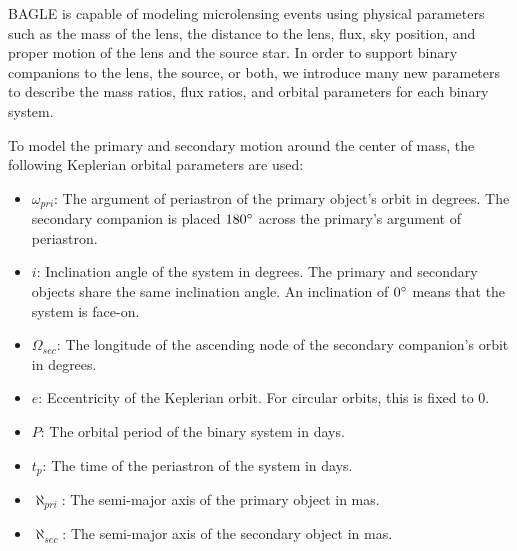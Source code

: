 \documentclass[twocolumn]{aastex701}
\newcommand{\tnot}{t_{0,\sun}}
\newcommand{\w}{\omega_{pri}}
\newcommand{\bigomega}{\Omega_{sec}}
\newcommand{\inclination}{\textit{i}}
\newcommand{\eccentricity}{\textit{e}}
\newcommand{\period}{\textit{P}}
\newcommand{\al}{\aleph_{pri}}
\newcommand{\ala}{\aleph_{sec}}
\begin{document}
BAGLE is capable of modeling microlensing events using physical parameters such as the mass of the lens, the distance to the lens, flux, sky position, and proper motion of the lens and the source star. In order to support binary companions to the lens, the source, or both, we introduce many new parameters to describe the mass ratios, flux ratios, and orbital parameters for each binary system. 

To model the primary and secondary motion around the center of mass, the following Keplerian orbital parameters are used: 



\begin{itemize}
\label{keplerian_elems}
    \item $\w$: The argument of periastron of the primary object's orbit in degrees. The secondary companion is placed $180 \degree$ across the primary's argument of periastron. 
    \item $\inclination$: Inclination angle of the system in degrees. The primary and secondary objects share the same inclination angle.  An inclination of $0\degree$ means that the system is face-on.
    \item $\bigomega$: The longitude of the ascending node of the secondary companion's orbit in degrees. 
    \item $\eccentricity$: Eccentricity of the Keplerian orbit. For circular orbits, this is fixed to 0. 
    \item $\period$: The orbital period of the binary system in days. 
    \item $t_p$: The time of the periastron of the system in days. 
    \item $\al$: The semi-major axis of the primary object in mas.
    \item $\ala$: The semi-major axis of the secondary object in mas. 
\end{itemize}
\end{document}
